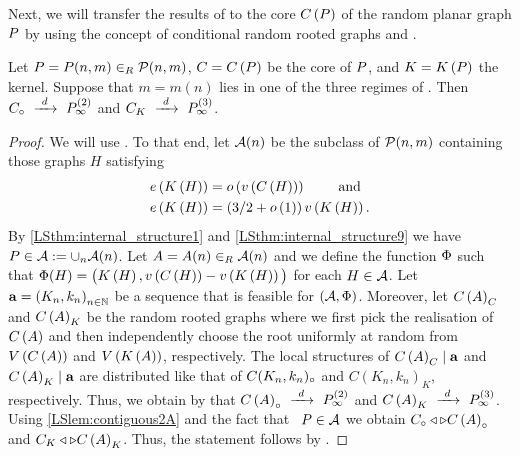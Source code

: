 Next, we will transfer the results of  to the core $C\left(P\right)$ of the random planar graph $P$ by using the concept of conditional random rooted graphs and .
\begin{lem}\label{LSlem:core_local}
	Let $P=P(n,m)\in_R\mathcal{P}(n,m)$, $C=C\left(P\right)$ be the core of $P$, and $K=K\left(P\right)$ the kernel. Suppose that $m=m(n)$ lies in one of the three regimes of . Then $C_\circ~\xrightarrow{~d~}~P_{\infty}^{\left(2\right)}$ and $C_K~\xrightarrow{~d~}~P_{\infty}^{\left(3\right)}$.
\end{lem}
\begin{proof}
We will use . To that end, let $\mathcal{A}(n)$ be the subclass of $\mathcal{P}(n,m)$ containing those graphs $H$ satisfying
\begin{align*}
e\left({K\left(H\right)}\right)&=o\left(v\left({C\left(H\right)}\right)\right) ~~~~~~~\text{and}\\
e\left({K\left(H\right)}\right)&=\left(3/2+o\left(1\right)\right)v\left({K\left(H\right)}\right).
\end{align*}
By \ref{LSthm:internal_structure1} and \ref{LSthm:internal_structure9} we have \whp\ $P\in \mathcal{A}:=\cup_n\mathcal{A}(n)$. Let $A=A(n)\in_R\mathcal{A}(n)$ and we define the function $\Phi$ such that $\Phi(H)=\big(K\left(H\right), v\left({C\left(H\right)}\right)-v\left({K\left(H\right)}\right)\big)$ for each $H\in\mathcal{A}$. Let $\mathbf{a}=\left(K_n, k_n\right)_{n\in\mathbb{N}}$ be a sequence that is feasible for $\left(\mathcal{A}, \Phi\right)$. Moreover, let $C\left(A\right)_C$ and $C\left(A\right)_K$ be the random rooted graphs where we first pick the realisation of $C\left(A\right)$ and then independently choose the root uniformly at random from $V\left(C\left(A\right)\right)$ and $V\left(K\left(A\right)\right)$, respectively. The local structures of $C\left(A\right)_C \mid \mathbf{a}$ and $C\left(A\right)_K \mid \mathbf{a}$ are distributed like that of $C(K_n, k_n)_\circ$ and $C(K_n, k_n)_K$, respectively. Thus, we obtain by  that $C\left(A\right)_\circ~\xrightarrow{~d~}~P_{\infty}^{\left(2\right)}$ and $C\left(A\right)_K~\xrightarrow{~d~}~P_{\infty}^{\left(3\right)}$. Using \ref{LSlem:contiguous2A} and the fact that \whp\ $P\in \mathcal{A}$ we obtain $C_\circ \triangleleft \triangleright C\left(A\right)_\circ$ and $C_K \triangleleft \triangleright C\left(A\right)_K$. Thus, the statement follows by .
\end{proof}

